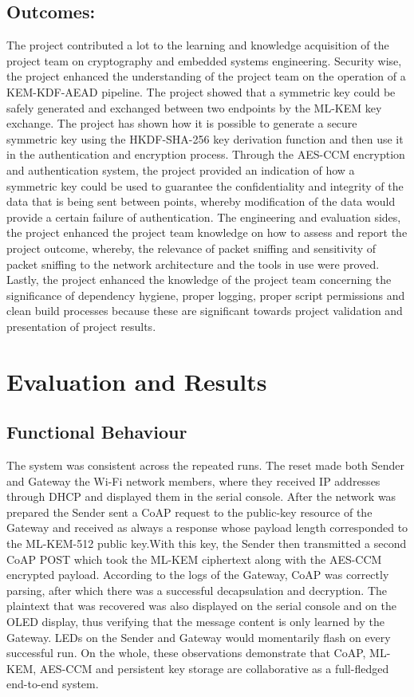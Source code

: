 \documentclass[a4paper]{scrartcl}
\begin{document}
    \subsection{Outcomes:}
    The project contributed a lot to the learning and knowledge acquisition of the project team on cryptography and embedded systems engineering. Security wise, the project enhanced the understanding of the project team on the operation of a KEM-KDF-AEAD pipeline. The project showed that a symmetric key could be safely generated and exchanged between two endpoints by the ML-KEM key exchange. The project has shown how it is possible to generate a secure symmetric key using the HKDF-SHA-256 key derivation function and then use it in the authentication and encryption process. Through the AES-CCM encryption and authentication system, the project provided an indication of how a symmetric key could be used to guarantee the confidentiality and integrity of the data that is being sent between points, whereby modification of the data would provide a certain failure of authentication. The engineering and evaluation sides, the project enhanced the project team knowledge on how to assess and report the project outcome, whereby, the relevance of packet sniffing and sensitivity of packet sniffing to the network architecture and the tools in use were proved. Lastly, the project enhanced the knowledge of the project team concerning the significance of dependency hygiene, proper logging, proper script permissions and clean build processes because these are significant towards project validation and presentation of project results.

    
    \section{Evaluation and Results}
    \subsection{Functional Behaviour}
    The system was consistent across the repeated runs. The reset made both Sender and Gateway the Wi-Fi network members, where they received IP addresses through DHCP and displayed them in the serial console. After the network was prepared the Sender sent a CoAP request to the public-key resource of the Gateway and received as always a response whose payload length corresponded to the ML-KEM-512 public key.With this key, the Sender then transmitted a second CoAP POST which took the ML-KEM ciphertext along with the AES-CCM encrypted payload. According to the logs of the Gateway, CoAP was correctly parsing, after which there was a successful decapsulation and decryption. The plaintext that was recovered was also displayed on the serial console and on the OLED display, thus verifying that the message content is only learned by the Gateway. LEDs on the Sender and Gateway would momentarily flash on every successful run. On the whole, these observations demonstrate that CoAP, ML-KEM, AES-CCM and persistent key storage are collaborative as a full-fledged end-to-end system.
\end{document}
